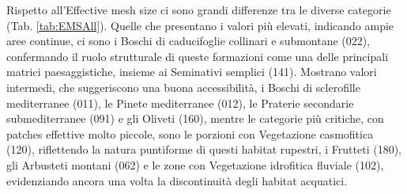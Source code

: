 \documentclass[
  a4paper,
]{book}
\begin{document}
Rispetto all'Effective mesh size ci sono grandi differenze tra le diverse categorie (Tab. \ref{tab:EMSAll}).
Quelle che presentano i valori più elevati, indicando ampie aree continue, ci sono i Boschi di caducifoglie collinari e submontane (022), confermando il ruolo strutturale di queste formazioni come una delle principali matrici paesaggistiche, insieme ai Seminativi semplici (141).
Mostrano valori intermedi, che suggeriscono una buona accessibilità, i Boschi di sclerofille mediterranee (011), le Pinete mediterranee (012), le Praterie secondarie submediterranee (091) e gli Oliveti (160), mentre le categorie più critiche, con patches effettive molto piccole, sono le porzioni con Vegetazione casmofitica (120), riflettendo la natura puntiforme di questi habitat rupestri, i Frutteti (180), gli Arbusteti montani (062) e le zone con Vegetazione idrofitica fluviale (102), evidenziando ancora una volta la discontinuità degli habitat acquatici.
\end{document}
